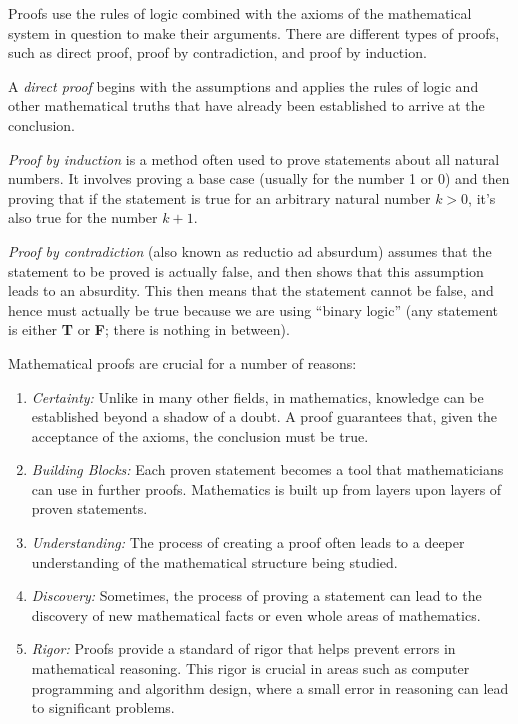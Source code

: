 Proofs use the rules of logic combined with the axioms of the mathematical system in question to make their arguments. There are different types of proofs, such as direct proof, proof by contradiction, and proof by induction.

A \textit{direct proof} begins with the assumptions and applies the rules of logic and other mathematical truths that have already been established to arrive at the conclusion.


\textit{Proof by induction} is a method often used to prove statements about all natural numbers. It involves proving a base case (usually for the number 1 or 0) and then proving that if the statement is true for an arbitrary natural number $k>0$, it's also true for the number $k+1$.

\textit{Proof by contradiction} (also known as reductio ad absurdum) assumes that the statement to be proved is actually false, and then shows that this assumption leads to an absurdity. This then means that the statement cannot be false, and hence must actually be true because we are using ``binary logic'' (any statement is either \textbf{T} or \textbf{F}; there is nothing in between).


Mathematical proofs are crucial for a number of reasons:
\begin{enumerate}
\renewcommand{\labelenumi}{(\alph{enumi})}
\setlength{\itemsep}{.2cm}
    \item \textit{Certainty:} Unlike in many other fields, in mathematics, knowledge can be established beyond a shadow of a doubt. A proof guarantees that, given the acceptance of the axioms, the conclusion must be true.
    \item \textit{Building Blocks:} Each proven statement becomes a tool that mathematicians can use in further proofs. Mathematics is built up from layers upon layers of proven statements.
    \item \textit{Understanding:} The process of creating a proof often leads to a deeper understanding of the mathematical structure being studied.
    \item \textit{Discovery:} Sometimes, the process of proving a statement can lead to the discovery of new mathematical facts or even whole areas of mathematics.
    \item \textit{Rigor:} Proofs provide a standard of rigor that helps prevent errors in mathematical reasoning. This rigor is crucial in areas such as computer programming and algorithm design, where a small error in reasoning can lead to significant problems. 
\end{enumerate}

